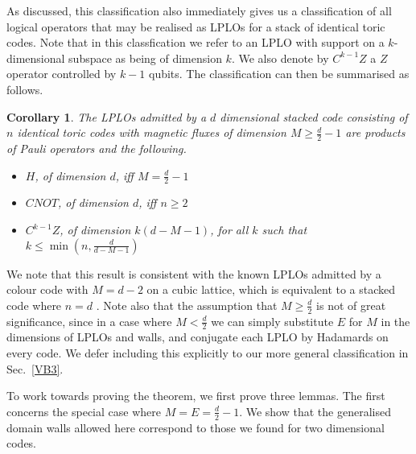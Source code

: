 \documentclass[pra,twocolumn,a4paper,nofootinbib]{revtex4-1}
\newtheorem{cor}{Corollary}
\begin{document}
As discussed, this classification also immediately gives us a classification of all logical operators that may be realised as LPLOs for a stack of identical toric codes. Note that in this classfication we refer to an LPLO with support on a $k$-dimensional subspace as being of dimension $k$. We also denote by $C^{k-1}Z$ a $Z$ operator controlled by $k-1$ qubits. The classification can then be summarised as follows.
\begin{cor}
The LPLOs admitted by a $d$ dimensional stacked code consisting of $n$ identical toric codes with magnetic fluxes of dimension $M\geq \frac{d}{2}-1$ are products of Pauli operators and the following.
\begin{itemize}
\item $H$, of dimension $d$, iff $M=\frac{d}{2}-1$
\item $CNOT$, of dimension $d$, iff $n \geq 2$
\item $C^{k-1}Z$, of dimension $k(d-M-1)$, for all $k$ such that $k \leq \min\left(n,\frac{d}{d-M-1}\right)$
\end{itemize}
\end{cor}
We note that this result is consistent with the known LPLOs admitted by a colour code with $M=d-2$ on a cubic lattice, which is equivalent to a stacked code where $n=d$ \cite{Kubica}. Note also that the assumption that $M \geq \frac{d}{2}$ is not of great significance, since in a case where $M < \frac{d}{2}$ we can simply substitute $E$ for $M$ in the dimensions of LPLOs and walls, and conjugate each LPLO by Hadamards on every code. We defer including this explicitly to our more general classification in Sec.~\ref{VB3}.

To work towards proving the theorem, we first prove three lemmas. The first concerns the special case where $M=E=\frac{d}{2}-1$. We show that the generalised domain walls allowed here correspond to those we found for two dimensional codes.
\end{document}
